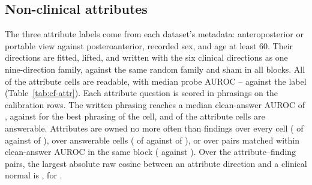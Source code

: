 \documentclass[11pt]{article}
\begin{document}
\subsection{Non-clinical attributes}
\label{app:cf-attributes}

The three attribute labels come from each dataset's metadata: anteroposterior or portable view against posteroanterior, recorded sex, and age at least 60. Their directions are fitted, lifted, and written with the six clinical directions as one nine-direction family, against the same random family and sham in all \cfAttrRefBlocks{} blocks. All \cfAttrReadable{} of the \cfAttrChestAttrN{} attribute cells are readable, with median probe AUROC \cfAttrAurocMin{}--\cfAttrAurocMax{} against the label (Table~\ref{tab:cf-attr}). Each attribute question is scored in \cfAttrqPhrasings{} phrasings on the calibration rows. The written phrasing reaches a median clean-answer AUROC of \cfAttrqWrittenAuroc{}, against \cfAttrqSelectedAuroc{} for the best phrasing of the cell, and \cfAttrqCapable{} of the \cfAttrqCells{} attribute cells are answerable. Attributes are owned no more often than findings over every cell (\cfAttrChestAttrOwned{} of \cfAttrChestAttrN{} against \cfAttrChestClinOwned{} of \cfAttrChestClinN{}), over answerable cells (\cfAttrCapAttrOwned{} of \cfAttrCapAttrN{} against \cfAttrCapClinOwned{} of \cfAttrCapClinN{}), or over \cfAttrPairAttrN{} pairs matched within \cfAttrPairWindow{} clean-answer AUROC in the same block (\cfAttrPairAttrOwned{} against \cfAttrPairClinOwned{}). Over the \cfAttrCosPairs{} attribute--finding pairs, the largest absolute raw cosine between an attribute direction and a clinical normal is \cfAttrCosMax{}, for \cfAttrCosPairLabel{}.
\end{document}

